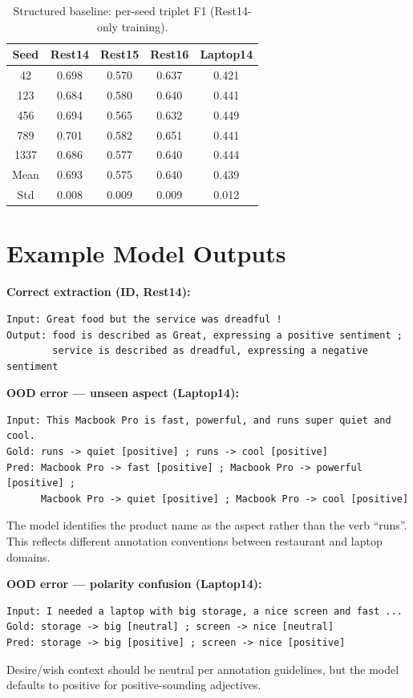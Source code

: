 \documentclass[12pt,a4paper]{report}
\begin{document}
\begin{table}[H]
\centering
\caption{Structured baseline: per-seed triplet F1 (Rest14-only training).}
\small
\begin{tabular}{@{}ccccc@{}}
\toprule
\textbf{Seed} & \textbf{Rest14} & \textbf{Rest15} & \textbf{Rest16} & \textbf{Laptop14} \\
\midrule
42 & 0.698 & 0.570 & 0.637 & 0.421 \\
123 & 0.684 & 0.580 & 0.640 & 0.441 \\
456 & 0.694 & 0.565 & 0.632 & 0.449 \\
789 & 0.701 & 0.582 & 0.651 & 0.441 \\
1337 & 0.686 & 0.577 & 0.640 & 0.444 \\
\midrule
Mean & 0.693 & 0.575 & 0.640 & 0.439 \\
Std & 0.008 & 0.009 & 0.009 & 0.012 \\
\bottomrule
\end{tabular}
\end{table}

\section{Example Model Outputs}

\textbf{Correct extraction (ID, Rest14):}
\begin{lstlisting}
Input: Great food but the service was dreadful !
Output: food is described as Great, expressing a positive sentiment ;
        service is described as dreadful, expressing a negative sentiment
\end{lstlisting}

\textbf{OOD error --- unseen aspect (Laptop14):}
\begin{lstlisting}
Input: This Macbook Pro is fast, powerful, and runs super quiet and cool.
Gold: runs -> quiet [positive] ; runs -> cool [positive]
Pred: Macbook Pro -> fast [positive] ; Macbook Pro -> powerful [positive] ;
      Macbook Pro -> quiet [positive] ; Macbook Pro -> cool [positive]
\end{lstlisting}
The model identifies the product name as the aspect rather than the verb ``runs''. This reflects different annotation conventions between restaurant and laptop domains.

\textbf{OOD error --- polarity confusion (Laptop14):}
\begin{lstlisting}
Input: I needed a laptop with big storage, a nice screen and fast ...
Gold: storage -> big [neutral] ; screen -> nice [neutral]
Pred: storage -> big [positive] ; screen -> nice [positive]
\end{lstlisting}
Desire/wish context should be neutral per annotation guidelines, but the model defaults to positive for positive-sounding adjectives.
\end{document}
